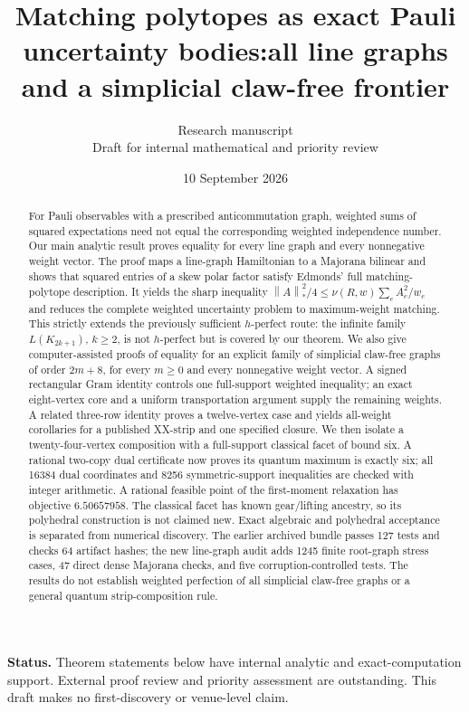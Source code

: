 \documentclass[11pt,a4paper]{article}
\title{Matching polytopes as exact Pauli uncertainty bodies:\newline all line graphs and a simplicial claw-free frontier}
\author{Research manuscript\smallskip\\\small Draft for internal mathematical and priority review}
\date{10 September 2026}
\theoremstyle{remark}\newtheorem{remark}[theorem]{Remark}
\newcommand{\norm}[1]{\left\lVert#1\right\rVert}
\begin{document}
\maketitle
\begin{abstract}
For Pauli observables with a prescribed anticommutation graph, weighted
sums of squared expectations need not equal the corresponding weighted
independence number. Our main analytic result proves equality for every
line graph and every nonnegative weight vector. The proof maps a line-graph
Hamiltonian to a Majorana bilinear and shows that squared entries of a
skew polar factor satisfy Edmonds' full matching-polytope description.
It yields the sharp inequality
$\norm{A}_*^2/4\leq\nu(R,w)\sum_e A_e^2/w_e$ and reduces the complete
weighted uncertainty problem to maximum-weight matching. This strictly
extends the previously sufficient $h$-perfect route: the infinite family
$L(K_{2k+1})$, $k\geq2$, is not $h$-perfect but is covered by our theorem.
We also give computer-assisted proofs of equality for an explicit family
of simplicial claw-free graphs of order $2m+8$, for every $m\geq0$ and
every nonnegative weight vector. A signed rectangular Gram
identity controls one full-support weighted inequality; an exact
eight-vertex core and a uniform transportation argument supply the
remaining weights. A related three-row identity proves a twelve-vertex
case and yields all-weight corollaries for a published XX-strip and one
specified closure. We then isolate a twenty-four-vertex composition with
a full-support classical facet of bound six. A rational two-copy dual
certificate now proves its quantum maximum is exactly six; all 16384
dual coordinates and 8256 symmetric-support inequalities are checked
with integer arithmetic. A rational feasible point of the first-moment
relaxation has objective $6.50657958$. The classical facet has known
gear/lifting ancestry, so its polyhedral construction is not claimed new.
Exact algebraic and
polyhedral acceptance is separated from numerical discovery. The earlier
archived bundle passes 127 tests and checks 64 artifact hashes; the new
line-graph audit adds 1245 finite root-graph stress cases, 47 direct dense
Majorana checks, and five corruption-controlled tests. The results do not establish weighted
perfection of all simplicial claw-free graphs or a general quantum
strip-composition rule.
\end{abstract}
\noindent\textbf{Status.} Theorem statements below have internal analytic
and exact-computation support. External proof review and priority assessment
are outstanding. This draft makes no first-discovery or venue-level claim.
\end{document}
